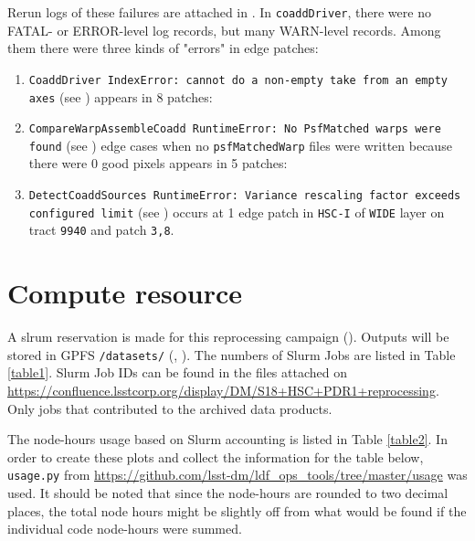 Rerun logs of these failures are attached in .
In \texttt{coaddDriver}, there were no FATAL- or ERROR-level log records, but many WARN-level records.
Among them there were three kinds of "errors" in edge patches:
\begin{enumerate}
\item \lstinline[style=basherror]+CoaddDriver IndexError: cannot do a non-empty take from an empty axes+ (see ) appears in 8 patches:

\item \lstinline[style=basherror]+CompareWarpAssembleCoadd RuntimeError: No PsfMatched warps were found+ (see ) edge cases when no \texttt{psfMatchedWarp} files were written because there were 0 good pixels appears in 5 patches:

\item \lstinline[style=basherror]+DetectCoaddSources RuntimeError: Variance rescaling factor exceeds configured limit+ (see ) occurs at 1 edge patch in \texttt{HSC-I} of \texttt{WIDE} layer on tract \texttt{9940} and patch \texttt{3,8}.
\end{enumerate}

\section{Compute resource}
A slrum reservation is made for this reprocessing campaign ().
Outputs will be stored in GPFS \texttt{/datasets/}   (, ).
The numbers of Slurm Jobs are listed in Table \ref{table1}.
Slurm Job IDs can be found in the files attached on \url{https://confluence.lsstcorp.org/display/DM/S18+HSC+PDR1+reprocessing}.
Only jobs that contributed to the archived data products.

The node-hours usage based on Slurm accounting is listed in Table \ref{table2}.
In order to create these plots and collect the information for the table below, \texttt{usage.py} from \url{https://github.com/lsst-dm/ldf_ops_tools/tree/master/usage} was used.
It should be noted that since the node-hours are rounded to two decimal places, the total node hours might be slightly off from what would be found if the individual code node-hours were summed.


